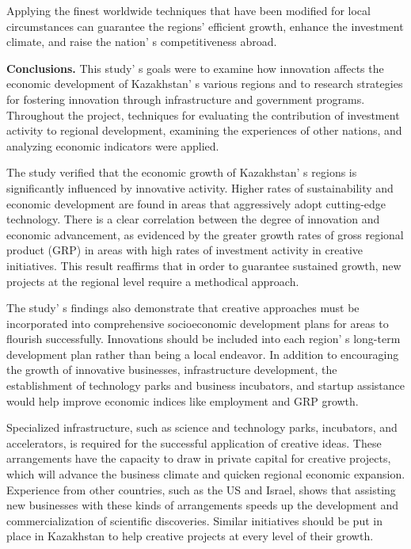 Applying the finest worldwide techniques that have been modified for
local circumstances can guarantee the regions'{}
efficient growth, enhance the investment climate, and raise the
nation' s competitiveness abroad.

{\bfseries Conclusions.} This study' s goals were to examine
how innovation affects the economic development of
Kazakhstan' s various regions and to research strategies
for fostering innovation through infrastructure and government programs.
Throughout the project, techniques for evaluating the contribution of
investment activity to regional development, examining the experiences
of other nations, and analyzing economic indicators were applied.

The study verified that the economic growth of
Kazakhstan' s regions is significantly influenced by
innovative activity. Higher rates of sustainability and economic
development are found in areas that aggressively adopt cutting-edge
technology. There is a clear correlation between the degree of
innovation and economic advancement, as evidenced by the greater growth
rates of gross regional product (GRP) in areas with high rates of
investment activity in creative initiatives. This result reaffirms that
in order to guarantee sustained growth, new projects at the regional
level require a methodical approach.

The study' s findings also demonstrate that creative
approaches must be incorporated into comprehensive socioeconomic
development plans for areas to flourish successfully. Innovations should
be included into each region' s long-term development
plan rather than being a local endeavor. In addition to encouraging the
growth of innovative businesses, infrastructure development, the
establishment of technology parks and business incubators, and startup
assistance would help improve economic indices like employment and GRP
growth.

Specialized infrastructure, such as science and technology parks,
incubators, and accelerators, is required for the successful application
of creative ideas. These arrangements have the capacity to draw in
private capital for creative projects, which will advance the business
climate and quicken regional economic expansion. Experience from other
countries, such as the US and Israel, shows that assisting new
businesses with these kinds of arrangements speeds up the development
and commercialization of scientific discoveries. Similar initiatives
should be put in place in Kazakhstan to help creative projects at every
level of their growth.

